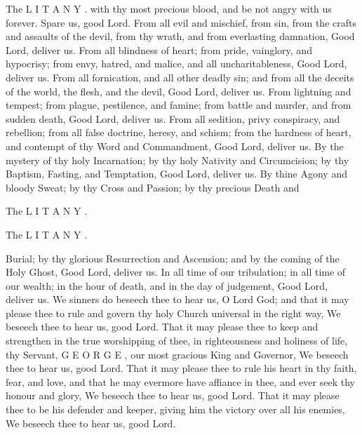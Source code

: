 The L I T A N Y . with thy most precious blood, and be not angry with us forever. Spare us, good Lord. From all evil and mischief, from sin, from the crafts and assaults of the devil, from thy wrath, and from everlasting damnation, Good Lord, deliver us. From all blindness of heart; from pride, vainglory, and hypocrisy; from envy, hatred, and malice, and all uncharitableness, Good Lord, deliver us. From all fornication, and all other deadly sin; and from all the deceits of the world, the flesh, and the devil, Good Lord, deliver us. From lightning and tempest; from plague, pestilence, and famine; from battle and murder, and from sudden death, Good Lord, deliver us. From all sedition, privy conspiracy, and rebellion; from all false doctrine, heresy, and schism; from the hardness of heart, and contempt of thy Word and Commandment, Good Lord, deliver us. By the mystery of thy holy Incarnation; by thy holy Nativity and Circumcision; by thy Baptism, Fasting, and Temptation, Good Lord, deliver us. By thine Agony and bloody Sweat; by thy Cross and Passion; by thy precious Death and

The L I T A N Y .

The L I T A N Y .

Burial; by thy glorious Resurrection and Ascension; and by the coming of the Holy Ghost, Good Lord, deliver us. In all time of our tribulation; in all time of our wealth; in the hour of death, and in the day of judgement, Good Lord, deliver us. We sinners do beseech thee to hear us, O Lord God; and that it may please thee to rule and govern thy holy Church universal in the right way, We beseech thee to hear us, good Lord. That it may please thee to keep and strengthen in the true worshipping of thee, in righteousness and holiness of life, thy Servant, G E O R G E , our most gracious King and Governor, We beseech thee to hear us, good Lord. That it may please thee to rule his heart in thy faith, fear, and love, and that he may evermore have affiance in thee, and ever seek thy honour and glory, We beseech thee to hear us, good Lord. That it may please thee to be his defender and keeper, giving him the victory over all his enemies, We beseech thee to hear us, good Lord.

